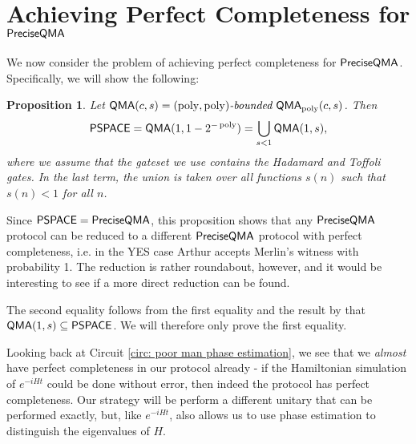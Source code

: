 \documentclass[11pt]{article}
\newtheorem{theorem}{Theorem}
\newtheorem{proposition}[theorem]{Proposition}
\theoremstyle{definition}
\newtheorem{definition}[theorem]{Definition}
\theoremstyle{remark}
\newcommand\QMA{{\sf{QMA}}}
\newcommand\PSPACE{{\sf{PSPACE}}}
\newcommand\preciseQMA{{\sf{PreciseQMA}}}
\newcommand\bddQMA[5]{{\left(#1,#2\right)}\textit{-bounded }\QMA_{#3}(#4,#5)}
\newcommand\revPSPACE{{\sf{revPSPACE}}}
\DeclareMathOperator{\poly}{poly}
\begin{document}
\section{Achieving Perfect Completeness for $\preciseQMA$}\label{app:perfectcompleteness}
%
We now consider the problem of achieving perfect completeness for $\preciseQMA$. Specifically, we will show the following:
\begingroup
\def\theproposition{\ref{prop: perfect completeness}}
\begin{proposition} Let $\QMA(c,s) = \bddQMA{\poly}{\poly}{\poly}{c}{s}$. Then
\[
\PSPACE = \QMA(1,1-2^{-\poly}) = \bigcup_{s < 1}\QMA(1,s),
\]
where we assume that the gateset we use contains the Hadamard and Toffoli gates. In the last term, the union is taken over all functions $s(n)$ such that $s(n) < 1$ for all $n$.
\end{proposition}
\addtocounter{theorem}{-1}
\endgroup


Since $\PSPACE = \preciseQMA$, this proposition shows that any $\preciseQMA$ protocol can be reduced to a different $\preciseQMA$ protocol with perfect completeness, i.e. in the YES case Arthur accepts Merlin's witness with probability 1. The reduction is rather roundabout, however, and it would be interesting to see if a more direct reduction can be found.

The second equality follows from the first equality and the result by \cite{ikw12} that $\QMA(1,s) \subseteq \PSPACE$. We will therefore only prove the first equality.

Looking back at Circuit \ref{circ: poor man phase estimation}, we see that we \emph{almost} have perfect completeness in our protocol already - if the Hamiltonian simulation of $e^{-iHt}$ could be done without error, then indeed the protocol has perfect completeness. Our strategy will be perform a different unitary that can be performed exactly, but, like $e^{-iHt}$, also allows us to use phase estimation to distinguish the eigenvalues of $H$.
\end{document}
